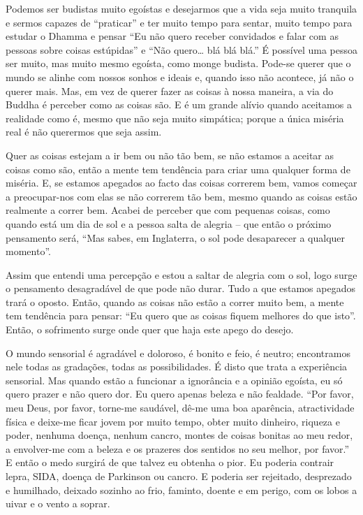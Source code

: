 Podemos ser budistas muito egoístas e desejarmos que a vida seja muito tranquila
e sermos capazes de ``praticar'' e ter muito tempo para sentar, muito tempo para
estudar o Dhamma e pensar ``Eu não quero receber convidados e falar com as
pessoas sobre coisas estúpidas'' e ``Não quero\ldots{} blá blá blá.'' É possível
uma pessoa ser muito, mas muito mesmo egoísta, como monge budista. Pode-se
querer que o mundo se alinhe com nossos sonhos e ideais e, quando isso não
acontece, já não o querer mais. Mas, em vez de querer fazer as coisas à nossa
maneira, a via do Buddha é perceber como as coisas são. E é um grande alívio
quando aceitamos a realidade como é, mesmo que não seja muito simpática; porque
a única miséria real é não querermos que seja assim.

Quer as coisas estejam a ir bem ou não tão bem, se não estamos a aceitar as
coisas como são, então a mente tem tendência para criar uma qualquer forma de
miséria. E, se estamos apegados ao facto das coisas correrem bem, vamos começar
a preocupar-nos com elas se não correrem tão bem, mesmo quando as coisas estão
realmente a correr bem. Acabei de perceber que com pequenas coisas, como quando
está um dia de sol e a pessoa salta de alegria -- que então o próximo pensamento
será, ``Mas sabes, em Inglaterra, o sol pode desaparecer a qualquer momento''.

Assim que entendi uma percepção e estou a saltar de alegria com o sol, logo
surge o pensamento desagradável de que pode não durar. Tudo a que estamos
apegados trará o oposto. Então, quando as coisas não estão a correr muito bem, a
mente tem tendência para pensar: ``Eu quero que as coisas fiquem melhores do que
isto''. Então, o sofrimento surge onde quer que haja este apego do desejo.

O mundo sensorial é agradável e doloroso, é bonito e feio, é neutro; encontramos
nele todas as gradações, todas as possibilidades. É disto que trata a
experiência sensorial. Mas quando estão a funcionar a ignorância e a opinião
egoísta, eu só quero prazer e não quero dor. Eu quero apenas beleza e não
fealdade. ``Por favor, meu Deus, por favor, torne-me saudável, dê-me uma boa
aparência, atractividade física e deixe-me ficar jovem por muito tempo, obter
muito dinheiro, riqueza e poder, nenhuma doença, nenhum cancro, montes de coisas
bonitas ao meu redor, a envolver-me com a beleza e os prazeres dos sentidos no
seu melhor, por favor.'' E então o medo surgirá de que talvez eu obtenha o pior.
Eu poderia contrair lepra, SIDA, doença de Parkinson ou cancro. E poderia ser
rejeitado, desprezado e humilhado, deixado sozinho ao frio, faminto, doente e em
perigo, com os lobos a uivar e o vento a soprar.

